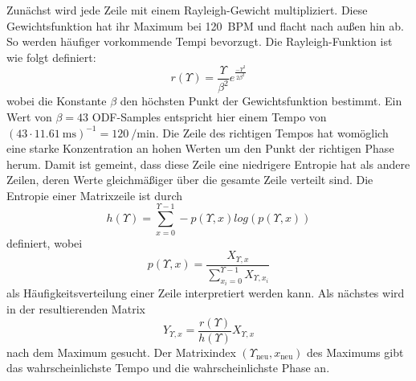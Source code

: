 {{			%
			Zunächst wird jede Zeile mit einem Rayleigh-Gewicht multipliziert.
			Diese Gewichtsfunktion hat ihr Maximum bei \SI{120}{BPM} und flacht nach au{\ss}en hin ab.
			So werden häufiger vorkommende Tempi bevorzugt.
			Die Rayleigh-Funktion ist wie folgt definiert:
			\begin{equation}
				r(\Upsilon) = \frac{\Upsilon}{\beta^2}e^{\frac{-\Upsilon^2}{2\beta^2}}
			\end{equation}
			wobei die Konstante $\beta$ den höchsten Punkt der Gewichtsfunktion bestimmt.
			Ein Wert von $\beta = 43$ ODF-Samples entspricht hier einem Tempo von
				$(43 \cdot \SI{11.61}{\milli\second})^{-1} = \SI{120}{\per\minute}$.
			Die Zeile des richtigen Tempos hat womöglich eine starke Konzentration an hohen Werten um den Punkt der richtigen Phase herum.
			Damit ist gemeint,
				dass diese Zeile eine niedrigere Entropie hat als andere Zeilen,
				deren Werte gleichmä{\ss}iger über die gesamte Zeile verteilt sind.
			Die Entropie einer Matrixzeile ist durch
				\begin{equation}
					h(\Upsilon) = \sum_{x = 0}^{\Upsilon - 1} -p(\Upsilon, x) log(p(\Upsilon, x))
				\end{equation}
				definiert, wobei
				\begin{equation}
					p(\Upsilon, x) = \frac{X_{\Upsilon, x}}{\sum_{x_i = 0}^{\Upsilon - 1}X_{\Upsilon, x_i}}
				\end{equation}
				als Häufigkeitsverteilung einer Zeile interpretiert werden kann.
			Als nächstes wird in der resultierenden Matrix
				\begin{equation}
					Y_{\Upsilon, x} = \frac{r(\Upsilon)}{h(\Upsilon)}X_{\Upsilon, x}
				\end{equation}
				nach dem Maximum gesucht.
			Der Matrixindex $(\Upsilon_{\text{neu}}, x_{\text{neu}})$ des Maximums gibt das wahrscheinlichste Tempo und die wahrscheinlichste Phase an.

}}
